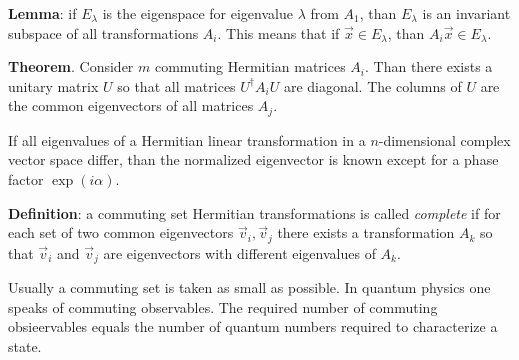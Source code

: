 {\bf Lemma}: if $E_\lambda$ is the eigenspace for eigenvalue $\lambda$ from
$A_1$, than $E_\lambda$ is an invariant subspace of all transformations
$A_i$. This means that if $\vec{x}\in E_\lambda$, than $A_i\vec{x}\in E_\lambda$.
 
{\bf Theorem}. Consider $m$ commuting Hermitian matrices $A_i$. Than there
exists a unitary matrix $U$ so that all matrices $U^\dagger A_iU$ are diagonal.
The columns of $U$ are the common eigenvectors of all matrices $A_j$.
 
If all eigenvalues of a Hermitian linear transformation in a $n$-dimensional
complex vector space differ, than the normalized eigenvector is known except
for a phase factor $\exp(i\alpha)$.
 
{\bf Definition}: a commuting set Hermitian transformations is called
{\it complete} if for each set of two common eigenvectors $\vec{v}_i,\vec{v}_j$
there exists a transformation $A_k$ so that $\vec{v}_i$ and $\vec{v}_j$ are
eigenvectors with different eigenvalues of $A_k$.
 
Usually a commuting set is taken as small as possible. In quantum physics one
speaks of commuting observables. The required number of commuting obsieervables
equals the number of quantum numbers required to characterize a state.

